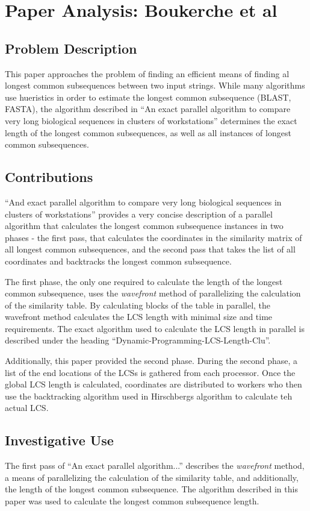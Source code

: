 \section{Paper Analysis: Boukerche et al }

\subsection{Problem Description}
This paper approaches the problem of finding an efficient means of
finding al longest common subsequences between two input
strings. While many algorithms use hueristics in order to estimate the
longest common subsequence (BLAST, FASTA), the algorithm described in
``An exact parallel algorithm to compare very long biological
sequences in clusters of workstations'' determines the exact length of
the longest common subsequences, as well as all instances of longest
common subsequences.

\subsection{Contributions}
``And exact parallel algorithm to compare very long biological
sequences in clusters of workstations'' provides a very concise
description of a parallel algorithm that calculates the longest common
subsequence instances in two phases - the first pass, that calculates
the coordinates in the similarity matrix of all longest common
subsequences, and the second pass that takes the list of all
coordinates and backtracks the longest common subsequence.

The first phase, the only one required to calculate the length of the
longest common subsequence, uses the \textit{wavefront} method of
parallelizing the calculation of the similarity table. By calculating
blocks of the table in parallel, the wavefront method calculates the
LCS length with minimal size and time requirements. The exact
algorithm used to calculate the LCS length in parallel is described
under the heading ``Dynamic-Programming-LCS-Length-Clu''.

Additionally, this paper provided the second phase. During the second
phase, a list of the end locations of the LCSs is gathered from each
processor. Once the global LCS length is calculated, coordinates are
distributed to workers who then use the backtracking algorithm used in
Hirschbergs algorithm to calculate teh actual LCS.

\subsection{Investigative Use}
The first pass of ``An exact parallel algorithm...'' describes the
\textit{wavefront} method, a means of parallelizing the calculation of
the similarity table, and additionally, the length of the longest
common subsequence. The algorithm described in this paper was used to
calculate the longest common subsequence length.
